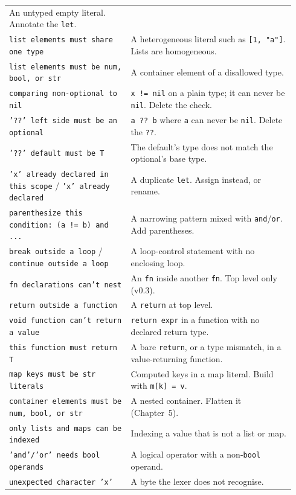 \begin{longtable}{@{}p{0.40\linewidth}p{0.54\linewidth}@{}}
An untyped empty literal. Annotate the \texttt{let}. \\
\addlinespace
\texttt{list elements must share one type} &
A heterogeneous literal such as \texttt{[1, "a"]}. Lists are homogeneous. \\
\addlinespace
\texttt{list elements must be num, bool, or str} &
A container element of a disallowed type. \\
\addlinespace
\texttt{comparing non-optional to nil} &
\texttt{x != nil} on a plain type; it can never be \texttt{nil}. Delete the
check. \\
\addlinespace
\texttt{'??' left side must be an optional} &
\texttt{a ?? b} where \texttt{a} can never be \texttt{nil}. Delete the
\texttt{??}. \\
\addlinespace
\texttt{'??' default must be T} &
The default's type does not match the optional's base type. \\
\addlinespace
\texttt{'x' already declared in this scope} / \texttt{'x' already declared} &
A duplicate \texttt{let}. Assign instead, or rename. \\
\addlinespace
\texttt{parenthesize this condition: (a != b) and ...} &
A narrowing pattern mixed with \texttt{and}/\texttt{or}. Add parentheses. \\
\addlinespace
\texttt{break outside a loop} / \texttt{continue outside a loop} &
A loop-control statement with no enclosing loop. \\
\addlinespace
\texttt{fn declarations can't nest} &
An \texttt{fn} inside another \texttt{fn}. Top level only (v0.3). \\
\addlinespace
\texttt{return outside a function} &
A \texttt{return} at top level. \\
\addlinespace
\texttt{void function can't return a value} &
\texttt{return expr} in a function with no declared return type. \\
\addlinespace
\texttt{this function must return T} &
A bare \texttt{return}, or a type mismatch, in a value-returning function. \\
\addlinespace
\texttt{map keys must be str literals} &
Computed keys in a map literal. Build with \texttt{m[k] = v}. \\
\addlinespace
\texttt{container elements must be num, bool, or str} &
A nested container. Flatten it (Chapter~5). \\
\addlinespace
\texttt{only lists and maps can be indexed} &
Indexing a value that is not a list or map. \\
\addlinespace
\texttt{'and'/'or' needs bool operands} &
A logical operator with a non-\texttt{bool} operand. \\
\addlinespace
\texttt{unexpected character 'x'} &
A byte the lexer does not recognise. \\
\end{longtable}
\endgroup

